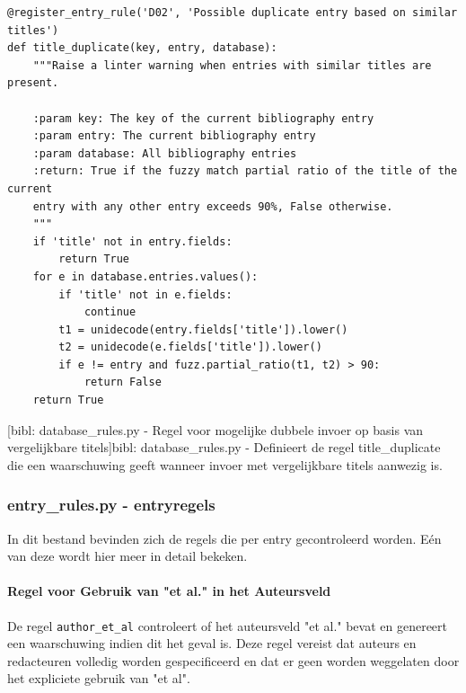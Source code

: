 \begin{verbatim}
@register_entry_rule('D02', 'Possible duplicate entry based on similar titles')
def title_duplicate(key, entry, database):
    """Raise a linter warning when entries with similar titles are present.

    :param key: The key of the current bibliography entry
    :param entry: The current bibliography entry
    :param database: All bibliography entries
    :return: True if the fuzzy match partial ratio of the title of the current
    entry with any other entry exceeds 90%, False otherwise.
    """
    if 'title' not in entry.fields:
        return True
    for e in database.entries.values():
        if 'title' not in e.fields:
            continue
        t1 = unidecode(entry.fields['title']).lower()
        t2 = unidecode(e.fields['title']).lower()
        if e != entry and fuzz.partial_ratio(t1, t2) > 90:
            return False
    return True
\end{verbatim}
[bibl: database\_rules.py - Regel voor mogelijke dubbele invoer op basis van vergelijkbare titels]{bibl: database\_rules.py - Definieert de regel title\_duplicate die een waarschuwing geeft wanneer invoer met vergelijkbare titels aanwezig is. \label{lst:bibl_rules_entry_duplicate}}


\subsubsection{entry\_rules.py - entryregels}

In dit bestand bevinden zich de regels die per entry gecontroleerd worden. Eén van deze wordt hier meer in detail bekeken.

\paragraph{Regel voor Gebruik van "et al." in het Auteursveld}

De regel \texttt{author\_et\_al} controleert of het auteursveld "et al." bevat en genereert een waarschuwing indien dit het geval is. Deze regel vereist dat auteurs en redacteuren volledig worden gespecificeerd en dat er geen worden weggelaten door het expliciete gebruik van "et al".

